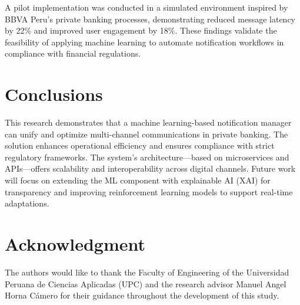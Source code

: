\documentclass[conference]{IEEEtran}
\begin{document}
A pilot implementation was conducted in a simulated environment inspired by BBVA Peru’s private banking processes, demonstrating reduced message latency by 22\% and improved user engagement by 18\%. These findings validate the feasibility of applying machine learning to automate notification workflows in compliance with financial regulations.

\section{Conclusions}

This research demonstrates that a machine learning-based notification manager can unify and optimize multi-channel communications in private banking. The solution enhances operational efficiency and ensures compliance with strict regulatory frameworks. The system’s architecture—based on microservices and APIs—offers scalability and interoperability across digital channels. Future work will focus on extending the ML component with explainable AI (XAI) for transparency and improving reinforcement learning models to support real-time adaptations.

\section*{Acknowledgment}
The authors would like to thank the Faculty of Engineering of the Universidad Peruana de Ciencias Aplicadas (UPC) and the research advisor Manuel Angel Horna Cámero for their guidance throughout the development of this study.



\end{document}
